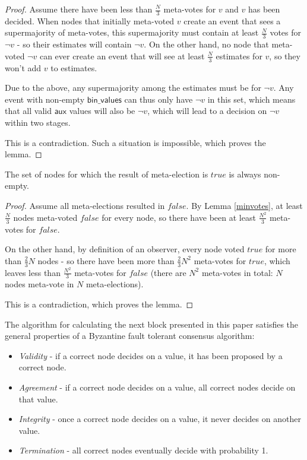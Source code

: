 \documentclass[a4paper,fleqn]{article}
\begin{document}
\begin{proof}
	Assume there have been less than $\frac{N}{3}$ meta-votes for $v$ and $v$ has been decided.
	When nodes that initially meta-voted $v$ create an event that sees a supermajority of
	meta-votes, this supermajority must contain at least $\frac{N}{3}$ votes for $\neg v$ - so
	their estimates will contain $\neg v$. On the other hand, no node that meta-voted $\neg v$ can
	ever create an event that will see at least $\frac{N}{3}$ estimates for $v$, so they won't add
	$v$ to estimates.

	Due to the above, any supermajority among the estimates must be for $\neg v$. Any event with
	non-empty $\mathsf{bin\_values}$ can thus only have $\neg v$ in this set, which means that
	all valid $\mathsf{aux}$ values will also be $\neg v$, which will lead to a decision on $\neg
	v$ within two stages.

	This is a contradiction. Such a situation is impossible, which proves the lemma.
\end{proof}

\begin{lem}\label{nonempty}
	The set of nodes for which the result of meta-election is $true$ is always non-empty.
\end{lem}

\begin{proof}
	Assume all meta-elections resulted in $false$. By Lemma \ref{minvotes}, at least $\frac{N}{3}$
	nodes meta-voted $false$ for every node, so there have been at least $\frac{N^2}{3}$ meta-votes
	for $false$.

	On the other hand, by definition of an observer, every node voted $true$ for more than
	$\frac{2}{3}N$ nodes - so there have been more than $\frac{2}{3}N^2$ meta-votes for $true$,
	which leaves less than $\frac{N^2}{3}$ meta-votes for $false$ (there are $N^2$ meta-votes in
	total: $N$ nodes meta-vote in $N$ meta-elections).

	This is a contradiction, which proves the lemma.
\end{proof}

\begin{thm}
	The algorithm for calculating the next block presented in this paper satisfies the general
	properties of a Byzantine fault tolerant consensus algorithm:
	\begin{itemize}
		\item \emph{Validity} - if a correct node decides on a value, it has been proposed by a
			correct node.
		\item \emph{Agreement} - if a correct node decides on a value, all correct nodes decide
			on that value.
		\item \emph{Integrity} - once a correct node decides on a value, it never decides on
			another value.
		\item \emph{Termination} - all correct nodes eventually decide with probability 1.
	\end{itemize}
\end{thm}
\end{document}
